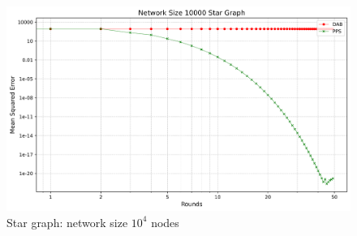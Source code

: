 \begin{figure}[H]
    \centering
    \includegraphics[scale=0.5]{figures/starGraphSimulations/DAB_vs_PPS_SG_r50_n10000.png}
    \caption{Star graph: network size $10^{4}$ nodes}
    \label{fig:10000StarGraph}
\end{figure}


